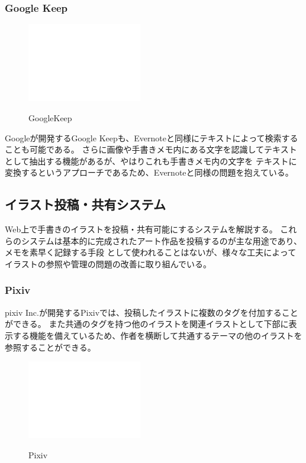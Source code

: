 \subsubsection{Google Keep}

\begin{figure}[htbp]
    \begin{center}
    {\includegraphics[width=50mm]{images/testimage.png}} \end{center}
    \caption{GoogleKeep}
\end{figure}


Googleが開発するGoogle Keepも、Evernoteと同様にテキストによって検索することも可能である。
さらに画像や手書きメモ内にある文字を認識してテキストとして抽出する機能があるが、やはりこれも手書きメモ内の文字を
テキストに変換するというアプローチであるため、Evernoteと同様の問題を抱えている。

\subsection{イラスト投稿・共有システム}
Web上で手書きのイラストを投稿・共有可能にするシステムを解説する。
これらのシステムは基本的に完成されたアート作品を投稿するのが主な用途であり、メモを素早く記録する手段
として使われることはないが、様々な工夫によってイラストの参照や管理の問題の改善に取り組んでいる。

\subsubsection{Pixiv}

pixiv Inc.が開発するPixivでは、投稿したイラストに複数のタグを付加することができる。
また共通のタグを持つ他のイラストを関連イラストとして下部に表示する機能を備えているため、作者を横断して共通するテーマの他のイラストを参照することができる。

\begin{figure}[htbp]
    \begin{center}
    {\includegraphics[width=50mm]{images/testimage.png}} \end{center}
    \caption{Pixiv}
\end{figure}


